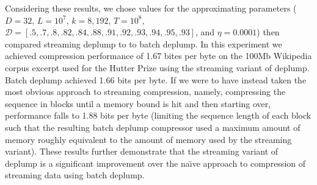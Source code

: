 Considering these results, we chose values for the approximating parameters ($D=32$, $L=10^7$, $k=8,192$, $T=10^8$, $\mathcal{D} = [.5, .7, .8, .82, .84, .88, .91, .92, .93, .94, .95, .93]$, and $\eta=0.0001$) then compared streaming deplump to to batch deplump.  In this experiment we achieved compression performance of 1.67 bites per byte on the 100Mb Wikipedia corpus excerpt used for the Hutter Prize \citep{Hutter2006} using the streaming variant of deplump.  Batch deplump \citep{Gasthaus2010} achieved 1.66 bits per byte.  If we were to have instead taken the most obvious approach to streaming compression, namely, compressing the sequence in blocks until a memory bound is hit and then starting over, performance falls to 1.88 bits per byte (limiting the sequence length of each block such that the resulting batch deplump compressor used a maximum amount of memory roughly equivalent to the amount of memory used by the streaming variant). These results further demonstrate that the streaming variant of deplump is a significant improvement over the na\"{\i}ve approach to compression of streaming data using batch deplump.


